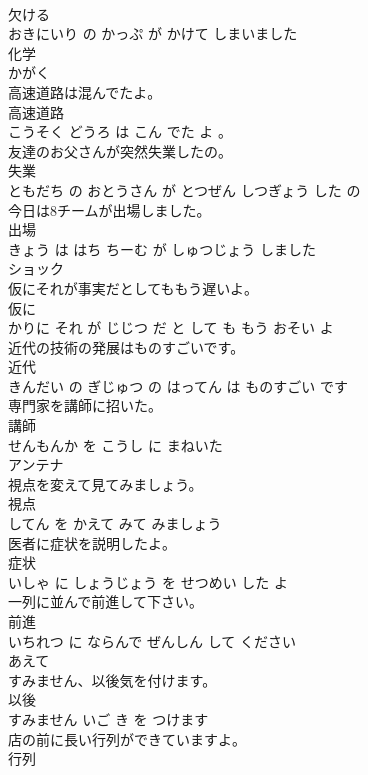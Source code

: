 \documentclass[8pt]{extreport}
\begin{document}
\begin{CJK}{UTF8}{min}
\\	欠ける 
\\	おきにいり の かっぷ が かけて しまいました			
\\	化学	
\\	かがく		
\\	高速道路は混んでたよ。	
\\	高速道路 
\\	こうそく どうろ は こん でた よ 。			
\\	友達のお父さんが突然失業したの。	
\\	失業 
\\	ともだち の おとうさん が とつぜん しつぎょう した の			
\\	今日は8チームが出場しました。	
\\	出場 
\\	きょう は はち ちーむ が しゅつじょう しました			
\\	ショック	
\\	仮にそれが事実だとしてももう遅いよ。	
\\	仮に 
\\	かりに それ が じじつ だ と して も もう おそい よ			
\\	近代の技術の発展はものすごいです。	
\\	近代 
\\	きんだい の ぎじゅつ の はってん は ものすごい です			
\\	専門家を講師に招いた。	
\\	講師 
\\	せんもんか を こうし に まねいた			
\\	アンテナ	
\\	視点を変えて見てみましょう。	
\\	視点 
\\	してん を かえて みて みましょう			
\\	医者に症状を説明したよ。	
\\	症状 
\\	いしゃ に しょうじょう を せつめい した よ			
\\	一列に並んで前進して下さい。	
\\	前進 
\\	いちれつ に ならんで ぜんしん して ください			
\\	あえて	
\\	すみません、以後気を付けます。	
\\	以後 
\\	すみません いご き を つけます			
\\	店の前に長い行列ができていますよ。	
\\	行列 

\end{CJK}
\end{document}
